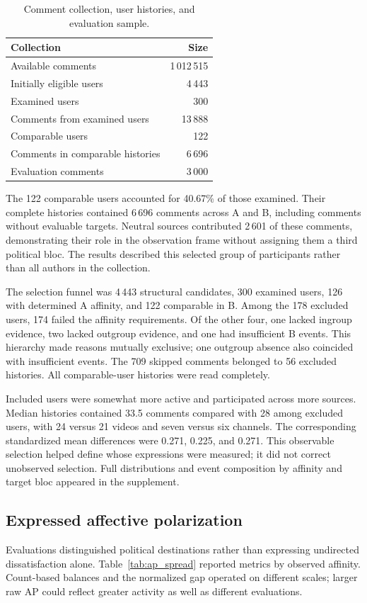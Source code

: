\documentclass[conference, letterpaper]{IEEEtran}
\begin{document}
\begin{table}[t]
\centering\small
\caption{Comment collection, user histories, and evaluation sample.}
\label{tab:sentimiento_favorabilidad}
\begin{tabular}{lr}\toprule
Collection & Size\\\midrule
Available comments & 1\,012\,515\\
Initially eligible users & 4\,443\\
Examined users & 300\\
Comments from examined users & 13\,888\\
Comparable users & 122\\
Comments in comparable histories & 6\,696\\
Evaluation comments & 3\,000\\\bottomrule
\end{tabular}
\end{table}

The 122 comparable users accounted for 40.67\% of those examined. Their complete histories contained 6\,696 
comments across A and B, including comments without evaluable targets. Neutral sources contributed 2\,601 of 
these comments, demonstrating their role in the observation frame without assigning them a third political bloc.
The results described this selected group of participants rather than all authors in the collection.

The selection funnel was 4\,443 structural candidates, 300 examined users, 126 with determined A affinity, and 122 comparable in B. Among the 178 excluded users, 174 failed the affinity requirements. Of the other four, one lacked ingroup evidence, two lacked outgroup evidence, and one had insufficient B events. This hierarchy made reasons mutually exclusive; one outgroup absence also coincided with insufficient events. The 709 skipped comments belonged to 56 excluded histories. All comparable-user histories were read completely.

Included users were somewhat more active and participated across more sources. Median histories contained 33.5 comments compared with 28 among excluded users, with 24 versus 21 videos and seven versus six channels. The corresponding standardized mean differences were 0.271, 0.225, and 0.271. This observable selection helped define whose expressions were measured; it did not correct unobserved selection. Full distributions and event composition by affinity and target bloc appeared in the supplement.

\subsection{Expressed affective polarization}
Evaluations distinguished political destinations rather than expressing undirected dissatisfaction alone. Table~\ref{tab:ap_spread} reported metrics by observed affinity. Count-based balances and the normalized gap operated on different scales; larger raw AP could reflect greater activity as well as different evaluations.
\end{document}
